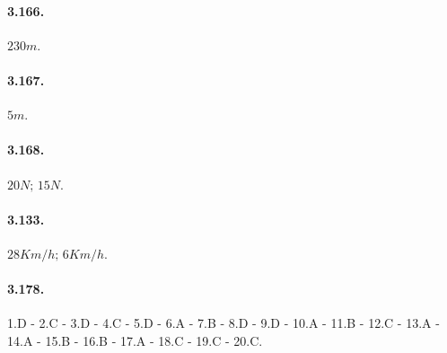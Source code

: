 \begin{multicols}{3}
\paragraph{3.166.}$ 230\unit{m} $.

\paragraph{3.167.}$ 5\unit{m} $.

\paragraph{3.168.}$ 20\unit{N};\, 15\unit{N} $.

\paragraph{3.133.}$ 28\unit{Km/h};\, 6\unit{Km/h} $.

\end{multicols}

\paragraph{3.178.} 1.D - 2.C - 3.D - 4.C - 5.D - 6.A - 7.B - 8.D - 9.D - 10.A - 11.B - 12.C - 13.A - 14.A - 15.B - 16.B - 17.A - 18.C - 19.C - 20.C.
